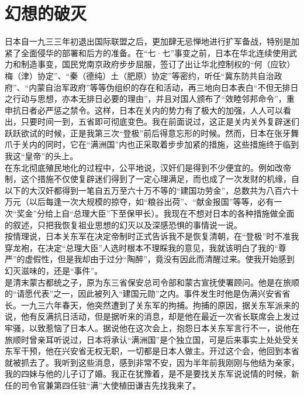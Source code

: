 \fancyhead[RO]{} %
\fancyhead[LE]{} %
\chapter*{幻想的破灭}
\thispagestyle{empty}
日本自一九三三年初退出国际联盟之后，更加肆无忌惮地进行扩军备战，特别是加紧了全面侵华的部署和后方的准备。在“七·七”事变之前，日本在华北连续使用武力和制造事变，国民党南京政府步步屈服，签订了出让华北控制权的“何（应钦）梅（津）协定”、“秦（德纯）土（肥原）协定”等密约，听任“冀东防共自治政府”、“内蒙自治军政府”等等伪组织的存在和活动，再三地向日本表白“不但无排日之行动与思想，亦本无排日必要的理由”，并且对国人颁布了“效睦邻邦命令”，重申抗日者必严惩之禁令。这样，日本在关内的势力有了极大的加强，人人可以看出，只要时间一到，五省即可彻底变色。我在前面说过，这正是关内关外复辟迷们跃跃欲试的时候，正是我第三次“登极”前后得意忘形的时候。然而，日本在张牙舞爪于关内的同时，它在“满洲国”内也正采取着步步加紧的措施，这些措施终于临到我这“皇帝”的头上。\\

在东北彻底殖民地化的过程中，公平地说，汉奸们是得到不少便宜的。例如改帝制，这个措施不仅使复辟迷们得到了一定心理满足，而也成了一次发财的机缘，自以下的大汉奸都得到一笔自五万至六十万不等的“建国功劳金”，总数共为八百六十万元（以后每逢一次大规模的掠夺，如“粮谷出荷”、“献金报国”等等，必有一次“奖金”分给上自“总理大臣”下至保甲长）。我现在不想对日本的各种措施做全面的叙述，只把我恢复祖业思想的幻灭以及深感恐惧的事情说一说。\\

按情理说，日本关东军在决定帝制时正式告诉我不是恢复清朝，在“登极”时不准我穿龙袍，在决定“总理大臣”人选时根本不理睬我的意见，我就该明白了我的“尊严”的虚假性，但是我却由于过分“陶醉”，竟没有因此而清醒过来。使我开始感到幻灭滋味的，还是“事件”。\\

是清末蒙古都统之子，原为东三省保安总司令部和蒙古宣抚使署顾问。他是在旅顺的“请愿代表”之一，因此被列入“建国元勋”之内。事件发生时他是伪满兴安省省长。一九三六年春天，他突然遭到了关东军的拘捕。拘捕的原因，据关东军派来的说，他有反满抗日活动，但是据听来的消息，却是他在最近一次省长联席会上发过牢骚，以致惹恼了日本人。据说他在这次会上，抱怨日本关东军言行不一，说他在旅顺时曾亲耳听说过，日本将承认“满洲国”是个独立国，可是后来事实上处处受关东军干预，他在兴安省无权无职，一切都是日本人做主。开过这个会，他回到本省就被抓去了。我听到这些消息，感到非常不安，因为半年前我刚刚与他结为亲家，我的四妹与他的儿子订了婚。我正在犹豫着，是不是要找关东军说说情的时候，新任的司令官兼第四任驻“满”大使植田谦吉先找我来了。\\

